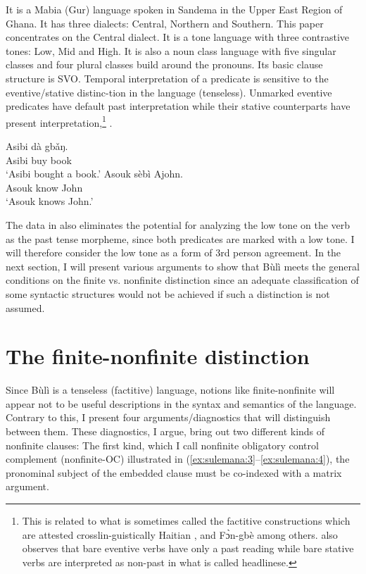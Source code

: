 \documentclass[output=paper,colorlinks,citecolor=brown]{langscibook}
\begin{document}
It is a Mabia (Gur) language spoken in Sandema in the Upper East Region of Ghana. It has three dialects: Central, Northern and Southern. This paper concentrates on the Central dialect. It is a tone language with three contrastive tones: Low, Mid and High. It is also a noun class language with five singular classes and four plural classes build around the pronouns. Its basic clause structure is SVO. Temporal interpretation of a predicate is sensitive to the eventive/stative distinc-tion in the language (tenseless). Unmarked eventive predicates have default past interpretation while their stative counterparts have present interpretation,\footnote{This is related to what is sometimes called the factitive constructions which are attested crosslin-guistically Haitian \citep{Dechaine1991}, and Fɔ̀n-gbè \citep{Avolonto1992} among others. \citet{Stowell1991} also observes that bare eventive verbs have only a past reading while bare stative verbs are interpreted as non-past in what is called headlinese.} .

\ea%
    \label{ex:sulemana:2}
    \ea%
    \label{ex:sulemana:2a}
    \gll    Asibi  dà gbǎŋ.\\
            Asibi buy book\\
    \glt    `Asibi bought a book.' 
    \ex%
    \label{ex:sulemana:2b}
    \gll    Asouk sèbì Ajohn.\\
            Asouk know John\\
    \glt    `Asouk knows John.'
    \z 
\z

The data in  also eliminates the potential for analyzing the low tone on the verb as the past tense morpheme, since both predicates are marked with a low tone. I will therefore consider the low tone as a form of 3rd person agreement. In the next section, I will present various arguments to show that Bùlì meets the general conditions on the finite vs. nonfinite distinction since an adequate classification of some syntactic structures would not be achieved if such a distinction is not assumed. 

\section{The finite-nonfinite distinction}\label{sec:sulemana:3}

Since Bùlì is a tenseless (factitive) language, notions like finite-nonfinite will appear not to be  useful descriptions in the syntax and semantics of the language. Contrary to this, I present four arguments/diagnostics that will distinguish between them. These diagnostics, I argue, bring out two different kinds of nonfinite clauses: The first kind, which I call nonfinite obligatory control  complement (nonfinite-OC) illustrated in (\ref{ex:sulemana:3}--\ref{ex:sulemana:4}), the pronominal subject of the embedded clause  must be co-indexed with a matrix argument. 
\end{document}
